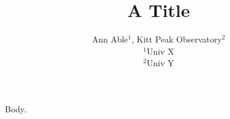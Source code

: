 \documentclass{article}
\begin{document}
\title{A Title}
\author{Ann Able$^{1}$, Kitt Peak Observatory$^{2}$\\ $^1$Univ X\\ $^2$Univ Y}
\maketitle
Body.
\end{document}

